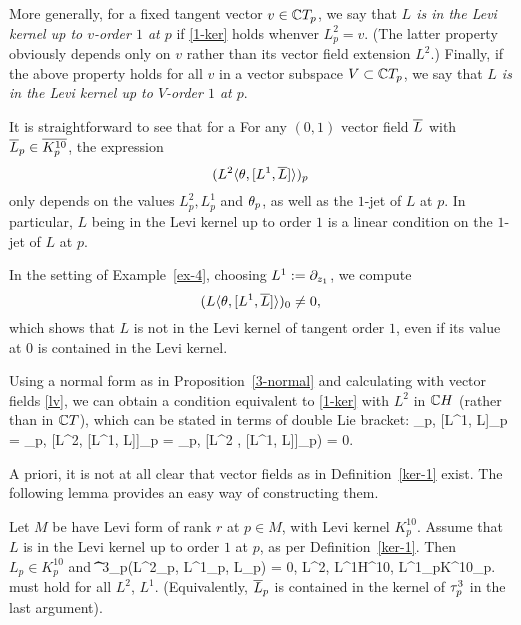 \documentclass[12pt]{amsart}
\begin{document}
More generally, 
for a fixed tangent vector $v\in {\mathbb{C}} T_p$,
we say that
{\em $L$ is in the Levi kernel up to 
$v$-order $1$ at $p$} 
if \eqref{1-ker}
holds whenver $L^2_p=v$. 
(The latter property obviously depends only on $v$
rather than its vector field extension $L^2$.)
Finally, if the above property holds for all $v$
in a vector subspace $V\subset {\mathbb{C}} T_p$,
we say that
{\em $L$ is in the Levi kernel up to 
$V$-order $1$ at $p$}.
\ed



It is straightforward to see that for a
\bl{}
For any $(0,1)$ vector field $\overline{L}$
with $\overline{L}_p\in \overline{K^{10}_p}$, 
the expression
$$ 
	(L^2 \langle \theta, [L^1, \overline{L}] \rangle)_p 
$$
only depends on the values $L^2_p, L^1_p$ and $\theta_p$,
as well as the $1$-jet of $L$ at $p$.
In particular,  $L$ being in the Levi kernel up to order $1$
is a linear condition on the $1$-jet of $L$ at $p$.
\el

\be
In the setting of Example~\ref{ex-4},
choosing $L^1:= \partial_{z_1}$, we compute
$$
	(L \langle \theta, [L^1, \overline{L}] \rangle )_0 \ne 0,
$$
which shows that $L$ is not in the Levi kernel of tangent order $1$,
even if its value at $0$ is contained in the Levi kernel.
\ee


\br{}
Using a normal form as in Proposition~\ref{3-normal} 
and calculating with vector fields \eqref{lv},
we can obtain a condition equivalent to
 \eqref{1-ker}
with $L^2$ in ${\mathbb{C}} H$ (rather than in ${\mathbb{C}} T$), which can be 
stated in terms of double Lie bracket:
\beq{}
	\la \th_p, [L^1, \1L]_p\ra
	= \la \th_p, [L^2, [L^1, \1L]]_p \ra 
	= \la \th_p, [\1L^2 , [L^1, \1L]]_p\ra)
	= 0.
\eeq
\er



A priori, it is not at all clear
that vector fields as in Definition~\ref{ker-1} exist.
The following lemma
provides an easy way of constructing them.


\bl{}
Let $M$ be have Levi form of rank $r$ at $p\in M$,
with Levi kernel $K^{10}_p$.
Assume that $L$ is in the Levi kernel
up to order $1$ at $p$,
as per Definition~\ref{ker-1}.
Then $L_p\in K^{10}_p$ and
\beq{}
	\t^3_p(L^2_p, L^1_p, \1L_p) 
	= 0, 
	\quad L^2, L^1\in H^{10}, 
	\quad L^1_p\in K^{10}_p.
\eeq
must hold for all $L^2$, $L^1$.
(Equivalently, $\overline{L}_p$ is contained in the kernel of $\tau^3_p$ in the last argument).
\end{document}
